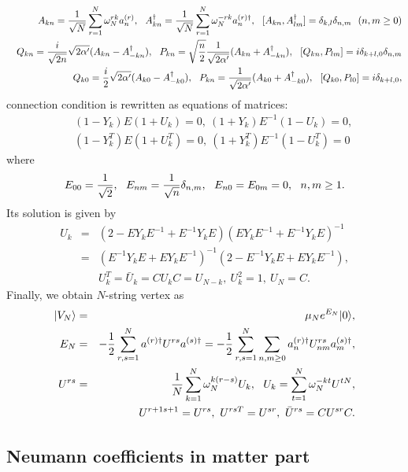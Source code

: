 \documentclass[12pt,a4paper]{article}
\begin{document}
\begin{eqnarray}
&&A_{kn}={1\over\sqrt N}\sum_{r=1}^N \omega_N^{rk} a_n^{(r)},\ \ 
A^\dagger_{kn}={1\over\sqrt N}\sum_{r=1}^N \omega_N^{-rk} a_n^{(r)\dagger},\ \ [A_{kn},A^\dagger_{lm}]=\delta_{k,l}\delta_{n,m}\ \ (n,m\geq0)\nonumber\\
&&Q_{kn}={i\over\sqrt{2n}}\sqrt{2\alpha'}(A_{kn}-A^\dagger_{-kn}),\ \ 
P_{kn}=\sqrt{n\over2}{1\over\sqrt{2\alpha'}}(A_{kn}+A^\dagger_{-kn}),\ \ [Q_{kn},P_{lm}]=i\delta_{k+l,0}\delta_{n,m}\nonumber\\
&&Q_{k0}={i\over2}\sqrt{2\alpha'}(A_{k0}-A^\dagger_{-k0}),\ \ 
P_{kn}={1\over\sqrt{2\alpha'}}(A_{k0}+A^\dagger_{-k0}),\ \ [Q_{k0},P_{l0}]=i\delta_{k+l,0},
\end{eqnarray}
connection condition is rewritten as equations of matrices:
\begin{eqnarray}
&&(1-Y_k)E(1+U_k)=0,\ (1+Y_k)E^{-1}(1-U_k)=0,\nonumber\\
&&(1-Y_k^T)E(1+U_k^T)=0,\ (1+Y_k^T)E^{-1}(1-U_k^T)=0
\end{eqnarray}
where
\begin{equation}
E_{00}={1\over\sqrt2},\ \ E_{nm}={1\over\sqrt n}\delta_{n,m},\ \ E_{n0}=E_{0m}=0,\ \ n,m\geq1.
\end{equation}
Its solution is given by
\begin{eqnarray}
U_k&=&(2-EY_kE^{-1}+E^{-1}Y_kE)(EY_kE^{-1}+E^{-1}Y_kE)^{-1}\nonumber\\
&=&(E^{-1}Y_kE+EY_kE^{-1})^{-1}(2-E^{-1}Y_kE+EY_kE^{-1}),\nonumber\\
&&U_k^T={\bar U_k}=CU_kC=U_{N-k},\ U_k^2=1,\ U_N=C.%
\end{eqnarray}
Finally, we obtain $N$-string vertex as
\begin{eqnarray}
\label{eqn:NGJ}
|V_N\rangle&=&\mu_N e^{E_N}|0\rangle,\nonumber\\
E_N&=&-{1\over2}\sum_{r,s=1}^N a^{(r)\dagger}U^{rs}a^{(s)\dagger}=
-{1\over2}\sum_{r,s=1}^N \sum_{n,m\geq0} a^{(r)\dagger}_n U^{rs}_{nm}a^{(s)\dagger}_m,\nonumber\\
U^{rs}&=&{1\over N}\sum_{k=1}^N\omega_N^{k(r-s)}U_k,\ \ U_k=\sum_{t=1}^N\omega_N^{-kt}U^{tN},\nonumber\\
&&U^{r+1s+1}=U^{rs},\ U^{rsT}=U^{sr},\ {\bar U^{rs}}=CU^{sr}C.
\end{eqnarray}

\subsection{Neumann coefficients in matter part \label{sec:NEU}}
\end{document}
